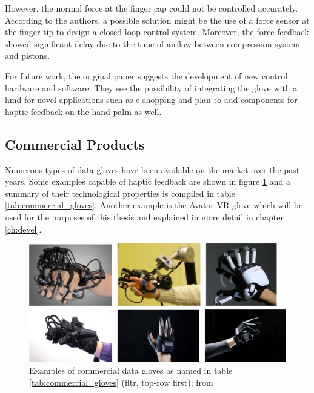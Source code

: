 \documentclass[hyperref, bachelorofscience]{cgvpub}
\begin{document}
However, the normal force at the finger cap could not be controlled accurately. According to the authors, a possible solution might be the use of a force sensor at the finger tip to design a closed-loop control system. Moreover, the force-feedback showed significant delay due to the time of airflow between compression system and pistons.

For future work, the original paper suggests the development of new control hardware and software. They see the possibility of integrating the glove with a \acrfull{hmd} for novel applications such as e-shopping and plan to add components for haptic feedback on the hand palm as well.

\subsection{Commercial Products}
Numerous types of data gloves have been available on the market over the past years. Some examples capable of haptic feedback are shown in figure \ref{fig:commercial_gloves} and a summary of their technological properties is compiled in table \ref{tab:commercial_gloves}. Another example is the Avatar VR glove which will be used for the purposes of this thesis and explained in more detail in chapter \ref{ch:devel}.

\begin{figure}
	\includegraphics[width=\linewidth]{../pics/commercial_gloves}
	\caption{Examples of commercial data gloves as named in table \ref{tab:commercial_gloves} (fltr, top-row first); from \cite{wang19}}
	\label{fig:commercial_gloves}
\end{figure}
\end{document}
